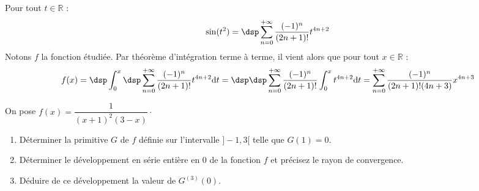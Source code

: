 \documentclass[a4paper,10pt]{report}
\begin{document}
\corr Pour tout $t\in\mathbb{R}$ : 
\[
\sin(t^2)=\dsp\sum_{n=0}^{+\infty}\dfrac{(-1)^n}{(2n+1)!}t^{4n+2}
\]
Notons $f$ la fonction étudiée. Par théorème d'intégration terme à terme, il vient alors que pour tout $x\in\mathbb{R}$ : 
$$f(x)=\dsp\int_0^x\dsp\sum_{n=0}^{+\infty}\dfrac{(-1)^n}{(2n+1)!}t^{4n+2}\mathrm{d}t=\dsp\dsp\sum_{n=0}^{+\infty}\dfrac{(-1)^n}{(2n+1)!}\int_0^xt^{4n+2}\mathrm{d}t=\sum_{n=0}^{+\infty}\dfrac{(-1)^n}{(2n+1)!(4n+3)}x^{4n+3}$$

\begin{Exa} On pose $f(x)=\dfrac{1}{(x+1)^{2}(3-x)} \cdot$
\begin{enumerate}
\item Déterminer la primitive $G$ de $f$ définie sur l'intervalle $]-1,3[$ telle que $G(1)=0$.
\item Déterminer le développement en série entière en 0 de la fonction $f$ et précisez le rayon de convergence.
\item Déduire de ce développement la valeur de $G^{(3)}(0)$.
\end{enumerate}
\end{Exa}
\end{document}
